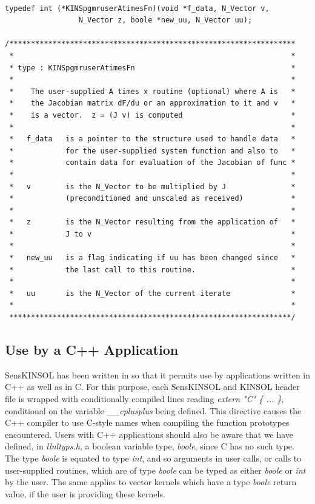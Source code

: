 \documentclass[11pt]{article}
\begin{document}
\small
\begin{verbatim}

typedef int (*KINSpgmruserAtimesFn)(void *f_data, N_Vector v,
                 N_Vector z, boole *new_uu, N_Vector uu);

/******************************************************************
 *                                                                *
 * type : KINSpgmruserAtimesFn                                    *
 *                                                                *
 *    The user-supplied A times x routine (optional) where A is   *
 *    the Jacobian matrix dF/du or an approximation to it and v   *
 *    is a vector.  z = (J v) is computed                         *
 *                                                                *
 *   f_data   is a pointer to the structure used to handle data   *
 *            for the user-supplied system function and also to   *
 *            contain data for evaluation of the Jacobian of func *
 *                                                                *
 *   v        is the N_Vector to be multiplied by J               *
 *            (preconditioned and unscaled as received)           *
 *                                                                *
 *   z        is the N_Vector resulting from the application of   *
 *            J to v                                              *
 *                                                                *
 *   new_uu   is a flag indicating if uu has been changed since   *
 *            the last call to this routine.                      *
 *                                                                *
 *   uu       is the N_Vector of the current iterate              *
 *                                                                *
 *****************************************************************/

\end{verbatim}
\normalsize

\subsection{Use by a C++ Application}

SensKINSOL has been written in so that it permits use by applications
written in C++ as well as in C.  For this purpose, each SensKINSOL and
KINSOL header file is wrapped with conditionally compiled lines reading
{\em extern "C" \{ ... \}}, conditional on the variable {\em
\_\_cplusplus} being defined.  This directive causes the C++ compiler
to use C-style names when compiling the function prototypes
encountered.  Users with C++ applications should also be aware that we
have defined, in {\em llnltyps.h}, a boolean variable type, {\em
boole}, since C has no such type.  The type {\em boole} is equated to
type {\em int}, and so arguments in user calls, or calls to
user-supplied routines, which are of type {\em boole} can be typed as
either {\em boole} or {\em int} by the user.  The same applies to
vector kernels which have a type {\em boole} return value, if the user
is providing these kernels.
\end{document}
